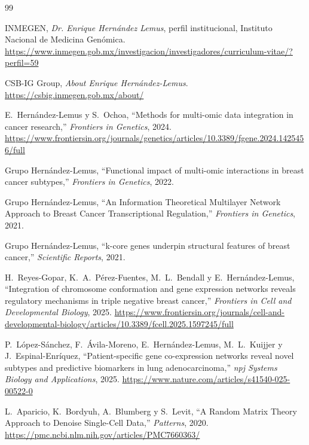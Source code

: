 \documentclass[11pt]{article}
\begin{document}
\begin{thebibliography}{99}

INMEGEN, \emph{Dr. Enrique Hernández Lemus}, perfil institucional, Instituto Nacional de Medicina Genómica.
\newblock \url{https://www.inmegen.gob.mx/investigacion/investigadores/curriculum-vitae/?perfil=59}

CSB-IG Group, \emph{About Enrique Hernández-Lemus}.
\newblock \url{https://csbig.inmegen.gob.mx/about/}

E.~Hernández-Lemus y S.~Ochoa,
\newblock ``Methods for multi-omic data integration in cancer research,''
\newblock \emph{Frontiers in Genetics}, 2024.
\newblock \url{https://www.frontiersin.org/journals/genetics/articles/10.3389/fgene.2024.1425456/full}

Grupo Hernández-Lemus,
\newblock ``Functional impact of multi-omic interactions in breast cancer subtypes,''
\newblock \emph{Frontiers in Genetics}, 2022.

Grupo Hernández-Lemus,
\newblock ``An Information Theoretical Multilayer Network Approach to Breast Cancer Transcriptional Regulation,''
\newblock \emph{Frontiers in Genetics}, 2021.

Grupo Hernández-Lemus,
\newblock ``k-core genes underpin structural features of breast cancer,''
\newblock \emph{Scientific Reports}, 2021.

H.~Reyes-Gopar, K.~A.~Pérez-Fuentes, M.~L.~Bendall y E.~Hernández-Lemus,
\newblock ``Integration of chromosome conformation and gene expression networks reveals regulatory mechanisms in triple negative breast cancer,''
\newblock \emph{Frontiers in Cell and Developmental Biology}, 2025.
\newblock \url{https://www.frontiersin.org/journals/cell-and-developmental-biology/articles/10.3389/fcell.2025.1597245/full}

P.~López-Sánchez, F.~Ávila-Moreno, E.~Hernández-Lemus, M.~L.~Kuijjer y J.~Espinal-Enríquez,
\newblock ``Patient-specific gene co-expression networks reveal novel subtypes and predictive biomarkers in lung adenocarcinoma,''
\newblock \emph{npj Systems Biology and Applications}, 2025.
\newblock \url{https://www.nature.com/articles/s41540-025-00522-0}

L.~Aparicio, K.~Bordyuh, A.~Blumberg y S.~Levit,
\newblock ``A Random Matrix Theory Approach to Denoise Single-Cell Data,''
\newblock \emph{Patterns}, 2020.
\newblock \url{https://pmc.ncbi.nlm.nih.gov/articles/PMC7660363/}


\end{thebibliography}
\end{document}
